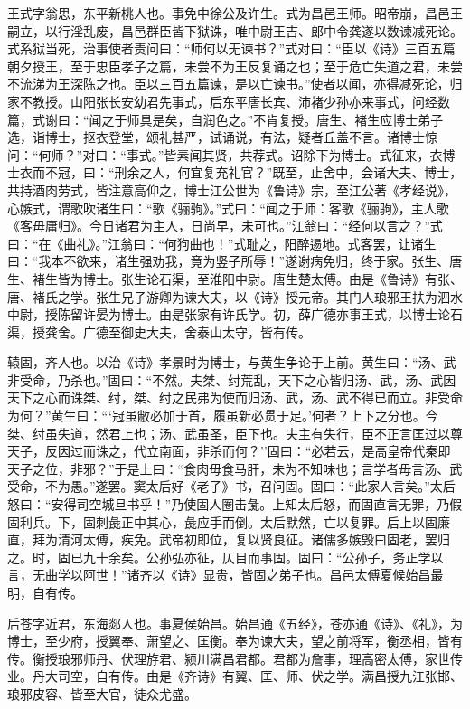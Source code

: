 \documentclass[]{article}
\begin{document}
王式字翁思，东平新桃人也。事免中徐公及许生。式为昌邑王师。昭帝崩，昌邑王嗣立，以行淫乱废，昌邑群臣皆下狱诛，唯中尉王吉、郎中令龚遂以数谏减死论。式系狱当死，治事使者责问曰：``师何以无谏书？''式对曰：``臣以《诗》三百五篇朝夕授王，至于忠臣孝子之篇，未尝不为王反复诵之也；至于危亡失道之君，未尝不流涕为王深陈之也。臣以三百五篇谏，是以亡谏书。''使者以闻，亦得减死论，归家不教授。山阳张长安幼君先事式，后东平唐长宾、沛褚少孙亦来事式，问经数篇，式谢曰：``闻之于师具是矣，自润色之。''不肯复授。唐生、褚生应博士弟子选，诣博士，抠衣登堂，颂礼甚严，试诵说，有法，疑者丘盖不言。诸博士惊问：``何师？''对曰：``事式。''皆素闻其贤，共荐式。诏除下为博士。式征来，衣博士衣而不冠，曰：``刑余之人，何宜复充礼官？''既至，止舍中，会诸大夫、博士，共持酒肉劳式，皆注意高仰之，博士江公世为《鲁诗》宗，至江公著《孝经说》，心嫉式，谓歌吹诸生曰：``歌《骊驹》。''式曰：``闻之于师：客歌《骊驹》，主人歌《客毋庸归》。今日诸君为主人，日尚早，未可也。''江翁曰：``经何以言之？''式曰：``在《曲礼》。''江翁曰：``何狗曲也！''式耻之，阳醉逷地。式客罢，让诸生曰：``我本不欲来，诸生强劝我，竟为竖子所辱！''遂谢病免归，终于家。张生、唐生、褚生皆为博士。张生论石渠，至淮阳中尉。唐生楚太傅。由是《鲁诗》有张、唐、褚氏之学。张生兄子游卿为谏大夫，以《诗》授元帝。其门人琅邪王扶为泗水中尉，授陈留许晏为博士。由是张家有许氏学。初，薛广德亦事王式，以博士论石渠，授龚舍。广德至御史大夫，舍泰山太守，皆有传。

辕固，齐人也。以治《诗》孝景时为博士，与黄生争论于上前。黄生曰：``汤、武非受命，乃杀也。''固曰：``不然。夫桀、纣荒乱，天下之心皆归汤、武，汤、武因天下之心而诛桀、纣，桀、纣之民弗为使而归汤、武，汤、武不得已而立。非受命为何？''黄生曰：```冠虽敝必加于首，履虽新必贯于足。'何者？上下之分也。今桀、纣虽失道，然君上也；汤、武虽圣，臣下也。夫主有失行，臣不正言匡过以尊天子，反因过而诛之，代立南面，非杀而何？''固曰：``必若云，是高皇帝代秦即天子之位，非邪？''于是上曰：``食肉毋食马肝，未为不知味也；言学者毋言汤、武受命，不为愚。''遂罢。窦太后好《老子》书，召问固。固曰：``此家人言矣。''太后怒曰：``安得司空城旦书乎！''乃使固人圈击彘。上知太后怒，而固直言无罪，乃假固利兵。下，固刺彘正中其心，彘应手而倒。太后默然，亡以复罪。后上以固廉直，拜为清河太傅，疾免。武帝初即位，复以贤良征。诸儒多嫉毁曰固老，罢归之。时，固已九十余矣。公孙弘亦征，仄目而事固。固曰：``公孙子，务正学以言，无曲学以阿世！''诸齐以《诗》显贵，皆固之弟子也。昌邑太傅夏候始昌最明，自有传。

后苍字近君，东海郯人也。事夏侯始昌。始昌通《五经》，苍亦通《诗》、《礼》，为博士，至少府，授翼奉、萧望之、匡衡。奉为谏大夫，望之前将军，衡丞相，皆有传。衡授琅邪师丹、伏理斿君、颍川满昌君都。君都为詹事，理高密太傅，家世传业。丹大司空，自有传。由是《齐诗》有翼、匡、师、伏之学。满昌授九江张邯、琅邪皮容、皆至大官，徒众尤盛。
\end{document}

